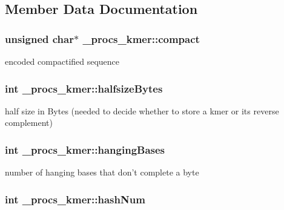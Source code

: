 \subsection{Member Data Documentation}
\hypertarget{struct__procs__kmer_a2a2f8c0b8848d3d908c253e0e57a31ea}{
\subsubsection[{compact}]{\setlength{\rightskip}{0pt plus 5cm}unsigned char$\ast$ \+\_\+procs\+\_\+kmer\+::compact}}\label{struct__procs__kmer_a2a2f8c0b8848d3d908c253e0e57a31ea}
encoded compactified sequence \hypertarget{struct__procs__kmer_aa45c7225cd512dec96f9a8745b24c047}{
\subsubsection[{halfsize\+Bytes}]{\setlength{\rightskip}{0pt plus 5cm}int \+\_\+procs\+\_\+kmer\+::halfsize\+Bytes}}\label{struct__procs__kmer_aa45c7225cd512dec96f9a8745b24c047}
half size in Bytes (needed to decide whether to store a kmer or its reverse complement) \hypertarget{struct__procs__kmer_a39a5e3c54a27bd06061038f8c9628471}{
\subsubsection[{hanging\+Bases}]{\setlength{\rightskip}{0pt plus 5cm}int \+\_\+procs\+\_\+kmer\+::hanging\+Bases}}\label{struct__procs__kmer_a39a5e3c54a27bd06061038f8c9628471}
number of hanging bases that don't complete a byte \hypertarget{struct__procs__kmer_a054cf4233a621787e53874d2c1c4495e}{
\subsubsection[{hash\+Num}]{\setlength{\rightskip}{0pt plus 5cm}int \+\_\+procs\+\_\+kmer\+::hash\+Num}}\label{struct__procs__kmer_a054cf4233a621787e53874d2c1c4495e}
